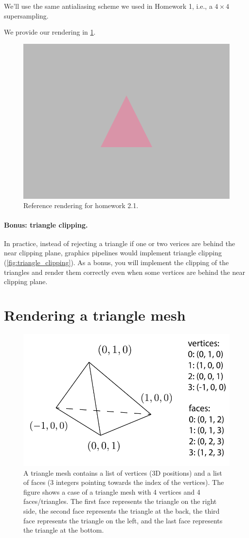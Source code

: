 We'll use the same antialiasing scheme we used in Homework 1, i.e., a $4\times4$ supersampling.

We provide our rendering in \cref{fig:hw2_1}.
\begin{figure}[h]
    \centering
    \includegraphics[width=0.5\linewidth]{imgs/hw_2_1.png}
    \caption{Reference rendering for homework 2.1.}
    \label{fig:hw2_1}
\end{figure}

\paragraph{Bonus: triangle clipping.} In practice, instead of rejecting a triangle if one or two verices are behind the near clipping plane, graphics pipelines would implement triangle clipping (\cref{fig:triangle_clipping}). As a bonus, you will implement the clipping of the triangles and render them correctly even when some vertices are behind the near clipping plane.

\section{Rendering a triangle mesh}

\begin{figure}[h]
    \centering
    \includegraphics[width=0.7\linewidth]{imgs/triangle_mesh.pdf}
    \caption{A triangle mesh contains a list of vertices (3D positions) and a list of faces (3 integers pointing towards the index of the vertices). The figure shows a case of a triangle mesh with 4 vertices and 4 faces/triangles. The first face represents the triangle on the right side, the second face represents the triangle at the back, the third face represents the triangle on the left, and the last face represents the triangle at the bottom.}
    \label{fig:triangle_mesh}
\end{figure}

